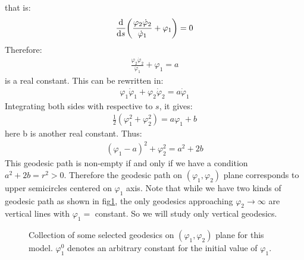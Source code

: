 that is:
\begin{align}
    \dv{s}(\frac{\varphi_{2} \dot \varphi_{2}}{\dot \varphi_{1}} + \varphi_{1}) =0
\end{align}
Therefore:
\begin{align}
    \frac{\varphi_{2} \dot \varphi_{2}}{\dot \varphi_{1}} + \varphi_{1} = a
\end{align}
is a real constant. This can be rewritten in:
\begin{align}
    \varphi_{1} \dot \varphi_{1} + \varphi_{2} \dot \varphi_{2} = a \dot \varphi_{1} 
\end{align}
Integrating both sides with respective to $s$, it gives:
\begin{align}
    \frac{1}{2} (\varphi_{1}^{2} + \varphi_{2} ^{2}) = a\varphi_{1} + b
\end{align}
here b is another real constant. Thus:
\begin{align}
    (\varphi_{1}-a)^{2} + \varphi_{2} ^{2} = a^{2} + 2b
\end{align}
This geodesic path is non-empty if and only if we have a condition $a^{2} + 2b = r^{2} >0$. Therefore the geodesic path on $(\varphi_{1},\varphi_{2})$ plane corresponds to upper semicircles centered on $\varphi_{1}$ axis. Note that while we have two kinds of geodesic path as shown in fig\ref{fig:geodesics}, the only geodesics approaching $\varphi_{2} \rightarrow \infty$ are vertical lines with $\varphi_{1} =$ constant. So we will study only vertical geodesics.\\
\begin{figure}
    \centering
    \caption{Collection of some selected geodesics on $(\varphi_{1}, \varphi_{2})$ plane for this model. $\varphi_{1}^{0}$ denotes an arbitrary constant for the initial value of $\varphi_{1}$.}
    \label{fig:geodesics}
\end{figure} 
